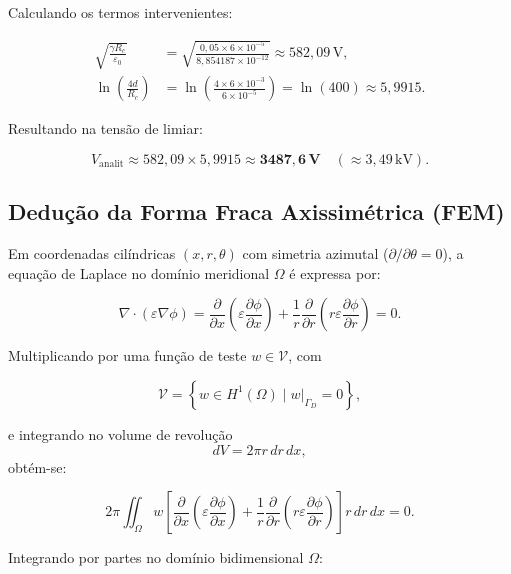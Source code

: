\documentclass[12pt,a4paper]{article}
\begin{document}
Calculando os termos intervenientes:

\begin{align}
\sqrt{
\frac{\gamma R_c}{\varepsilon_0}
}
&=
\sqrt{
\frac{0{,}05 \times 6 \times 10^{-5}}
{8{,}854187 \times 10^{-12}}
}
\approx
582{,}09\,\text{V},
\\[0.3cm]
\ln\left(
\frac{4d}{R_c}
\right)
&=
\ln\left(
\frac{4 \times 6 \times 10^{-3}}
{6 \times 10^{-5}}
\right)
=
\ln(400)
\approx
5{,}9915.
\end{align}

Resultando na tensão de limiar:

\begin{equation}
V_{\mathrm{analit}}
\approx
582{,}09 \times 5{,}9915
\approx
\mathbf{3487{,}6\,\text{V}}
\quad
(\approx 3{,}49\,\text{kV}).
\end{equation}

\subsection{Dedução da Forma Fraca Axissimétrica (FEM)}

Em coordenadas cilíndricas $(x,r,\theta)$ com simetria azimutal
($\partial/\partial\theta = 0$), a equação de Laplace no domínio meridional
$\Omega$ é expressa por:

\begin{equation}
\nabla \cdot (\varepsilon \nabla \phi)
=
\frac{\partial}{\partial x}
\left(
\varepsilon \frac{\partial\phi}{\partial x}
\right)
+
\frac{1}{r}
\frac{\partial}{\partial r}
\left(
r\varepsilon
\frac{\partial\phi}{\partial r}
\right)
=
0.
\end{equation}

Multiplicando por uma função de teste
$w \in \mathcal{V}$, com

\begin{equation}
\mathcal{V}
=
\left\{
w \in H^1(\Omega)
\mid
w|_{\Gamma_D}=0
\right\},
\end{equation}

e integrando no volume de revolução
\[
dV = 2\pi r\,dr\,dx,
\]
obtém-se:

\begin{equation}
2\pi
\iint_{\Omega}
w
\left[
\frac{\partial}{\partial x}
\left(
\varepsilon
\frac{\partial\phi}{\partial x}
\right)
+
\frac{1}{r}
\frac{\partial}{\partial r}
\left(
r\varepsilon
\frac{\partial\phi}{\partial r}
\right)
\right]
r\,dr\,dx
=
0.
\end{equation}

Integrando por partes no domínio bidimensional $\Omega$:
\end{document}
